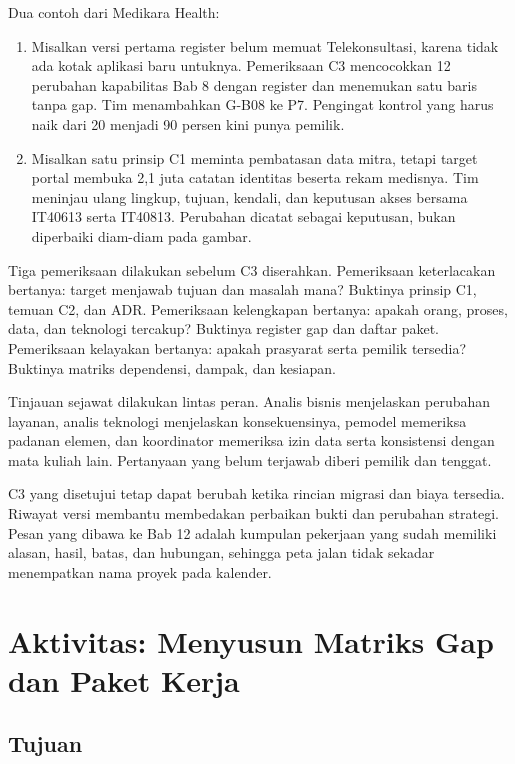 Dua contoh dari Medikara Health:
\begin{enumerate}
  \item Misalkan versi pertama register belum memuat Telekonsultasi, karena tidak ada kotak aplikasi baru untuknya. Pemeriksaan C3 mencocokkan 12
        perubahan kapabilitas Bab 8 dengan register dan menemukan satu baris tanpa gap. Tim menambahkan G-B08 ke P7. Pengingat kontrol yang harus naik
        dari 20 menjadi 90 persen kini punya pemilik.
  \item Misalkan satu prinsip C1 meminta pembatasan data mitra, tetapi target portal membuka 2,1 juta catatan identitas beserta rekam medisnya. Tim
        meninjau ulang lingkup, tujuan, kendali, dan keputusan akses bersama IT40613 serta IT40813. Perubahan dicatat sebagai keputusan, bukan diperbaiki
        diam-diam pada gambar.
\end{enumerate}

Tiga pemeriksaan dilakukan sebelum C3 diserahkan. Pemeriksaan keterlacakan bertanya: target menjawab tujuan
dan masalah mana? Buktinya prinsip C1, temuan C2, dan ADR. Pemeriksaan kelengkapan bertanya: apakah orang,
proses, data, dan teknologi tercakup? Buktinya register gap dan daftar paket. Pemeriksaan kelayakan bertanya:
apakah prasyarat serta pemilik tersedia? Buktinya matriks dependensi, dampak, dan kesiapan.

Tinjauan sejawat dilakukan lintas peran. Analis bisnis menjelaskan perubahan layanan, analis teknologi menjelaskan konsekuensinya, pemodel memeriksa padanan
elemen, dan koordinator memeriksa izin data serta konsistensi dengan mata kuliah lain. Pertanyaan yang belum terjawab diberi pemilik dan tenggat.

C3 yang disetujui tetap dapat berubah ketika rincian migrasi dan biaya tersedia. Riwayat versi membantu membedakan perbaikan bukti dan perubahan strategi. Pesan
yang dibawa ke Bab 12 adalah kumpulan pekerjaan yang sudah memiliki alasan, hasil, batas, dan hubungan, sehingga peta jalan tidak sekadar menempatkan nama proyek
pada kalender.

\section{Aktivitas: Menyusun Matriks Gap dan Paket Kerja}

\subsection*{Tujuan}

